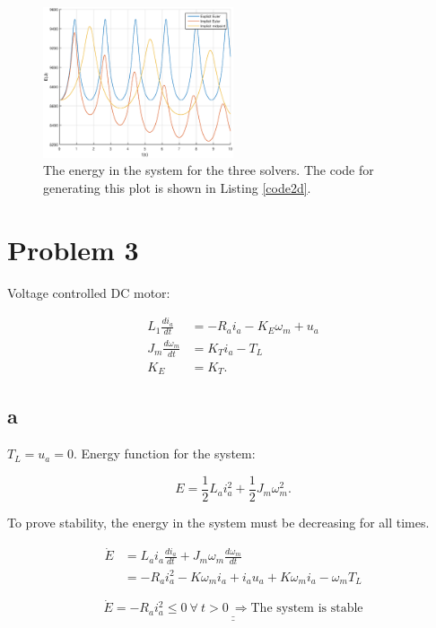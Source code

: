 \documentclass{article}
\begin{document}
\begin{figure}[!ht]\label{fig:spring2d}
	\centering
	\includegraphics[width = 0.5\textwidth]{ModSim_ex4_2d}
    \caption{The energy in the system for the three solvers. The code for generating this plot is shown in Listing \ref{code2d}.}
\end{figure}

\section{Problem 3}

Voltage controlled DC motor:

\begin{align*}
	L_1\frac{di_a}{dt} &= - R_ai_a - K_E\omega_m + u_a\\
	J_m\frac{d\omega_m}{dt} &= K_Ti_a - T_L\\
	K_E &= K_T.
\end{align*}

\subsection{a}

$T_L = u_a = 0$. Energy function for the system:

\begin{equation*}
	E = \frac{1}{2}L_ai_a^2 + \frac{1}{2}J_m\omega_m^2.
\end{equation*}

To prove stability, the energy in the system must be decreasing for all times. 

\begin{align*}
	\dot E &= L_ai_a\frac{di_a}{dt} + J_m\omega_m\frac{d\omega_m}{dt}\\
	&= -R_ai_a^2 - K\omega_mi_a + i_au_a+K\omega_mi_a - \omega_mT_L
	
\end{align*}

\begin{equation*}
	\underline{\underline{\dot E = -R_ai_a^2 \leq 0 \:\forall\: t > 0 \: \Rightarrow \text{The system is stable}}}
\end{equation*}
\end{document}
